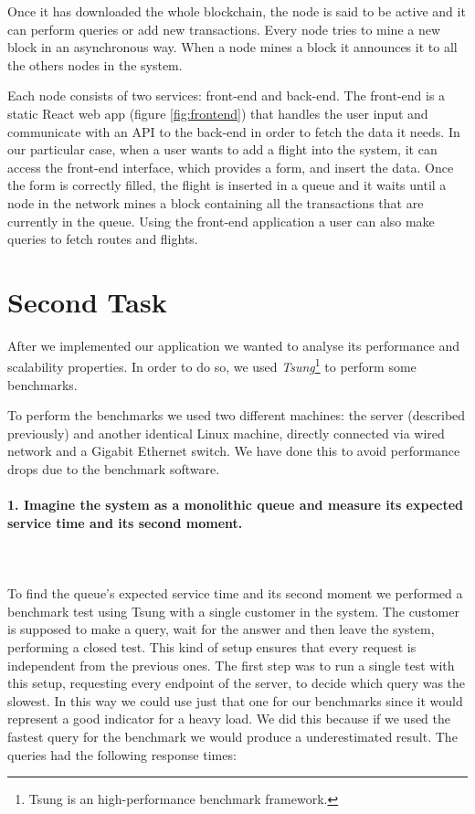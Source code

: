\documentclass[11pt]{scrartcl} %
\begin{document}
Once it has downloaded the whole blockchain, the node is said to be active and it can perform queries or add new transactions. Every node tries to mine a new block in an asynchronous way. When a node mines a block it announces it to all the others nodes in the system.

Each node consists of two services: front-end and back-end. The front-end is a static React web app (figure \ref{fig:frontend}) that handles the user input and communicate with an API to the back-end in order to fetch the data it needs. In our particular case, when a user wants to add a flight into the system, it can access the front-end interface, which provides a form, and insert the data. Once the form is correctly filled, the flight is inserted in a queue and it waits until a node in the network mines a block containing all the transactions that are currently in the queue. Using the front-end application a user can also make queries to fetch routes and flights. 

\section{Second Task}

After we implemented our application we wanted to analyse its performance and scalability properties. In order to do so, we used \textit{Tsung}\footnote{Tsung is an high-performance benchmark framework.} to perform some benchmarks.

To perform the benchmarks we used two different machines: the server (described previously) and another identical Linux machine, directly connected via wired network and a Gigabit Ethernet switch. We have done this to avoid performance drops due to the benchmark software.


\paragraph*{1. Imagine the system as a monolithic queue and measure its expected service time and its second moment.} \mbox{}\\\\ 

To find the queue's expected service time and its second moment we performed a benchmark test using Tsung with a single customer in the system. The customer is supposed to make a query, wait for the answer and then leave the system, performing a closed test. This kind of setup ensures that every request is independent from the previous ones. 
The first step was to run a single test with this setup, requesting every endpoint of the server, to decide which query was the slowest. In this way we could use just that one for our benchmarks since it would represent a good indicator for a heavy load.
We did this because if we used the fastest query for the benchmark we would produce a underestimated result. 
The queries had the following response times:
\end{document}
